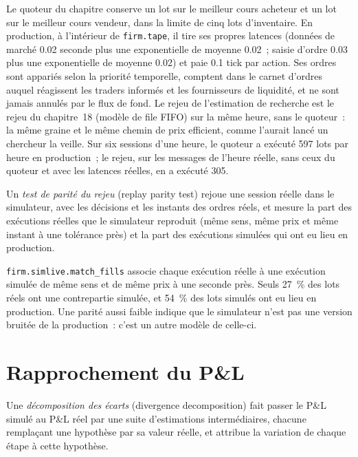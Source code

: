 Le quoteur du chapitre conserve un lot sur le meilleur cours acheteur et un lot sur le meilleur cours vendeur, dans la limite de cinq lots d'inventaire. En production, à l'intérieur de \texttt{firm.tape}, il tire ses propres latences
(données de marché 0.02 seconde plus une exponentielle de moyenne 0.02~; saisie d'ordre 0.03 plus une exponentielle de moyenne 0.02) et paie 0.1 tick par action. Ses ordres
sont appariés selon la priorité temporelle, comptent dans le carnet d'ordres auquel réagissent les traders informés et les fournisseurs de liquidité, et ne sont jamais annulés par le flux de fond. Le
rejeu de l'estimation de recherche est le rejeu du chapitre~18 (modèle de file FIFO) sur la même heure, sans le quoteur~: la même graine et le même chemin de prix efficient, comme
l'aurait lancé un chercheur la veille. Sur six sessions d'une heure, le quoteur a exécuté 597 lots par heure en production~; le rejeu, sur les messages de l'heure réelle, sans
ceux du quoteur et avec les latences réelles, en a exécuté 305.

\begin{definition}\label{def:rs:simulation-versus-live:parity}
Un \emph{test de parité du rejeu} (replay parity test) rejoue une session réelle dans le simulateur, avec les décisions et les instants des ordres réels, et mesure la
part des exécutions réelles que le simulateur reproduit (même sens, même prix et même instant à une tolérance près) et la part des exécutions simulées qui ont eu lieu en production.
\end{definition}

\texttt{firm.simlive.match\_fills} associe chaque exécution réelle à une exécution simulée de même sens et de même prix à une seconde près. Seuls 27~\% des lots réels ont une
contrepartie simulée, et 54~\% des lots simulés ont eu lieu en production. Une parité aussi faible indique que le simulateur n'est pas une version bruitée de la production~: c'est un autre modèle de celle-ci.

\section{Rapprochement du P\&L}

\begin{definition}\label{def:rs:simulation-versus-live:decomposition}
Une \emph{décomposition des écarts} (divergence decomposition) fait passer le P\&L simulé au P\&L réel par une suite d'estimations intermédiaires, chacune remplaçant
une hypothèse par sa valeur réelle, et attribue la variation de chaque étape à cette hypothèse.
\end{definition}

